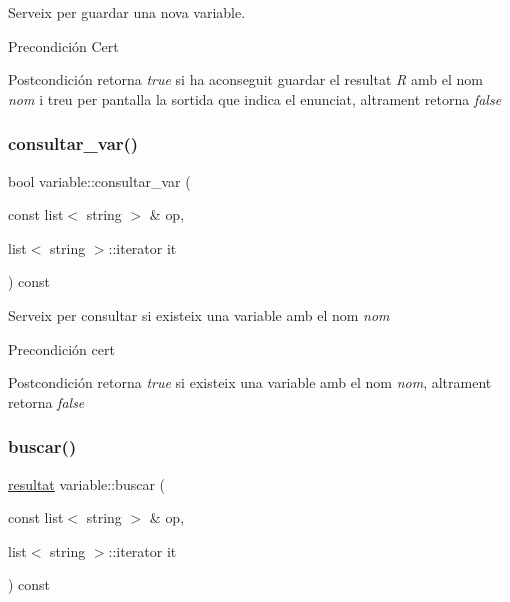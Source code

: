 Serveix per guardar una nova variable. 

\begin{DoxyPrecond}{Precondición}
Cert 
\end{DoxyPrecond}
\begin{DoxyPostcond}{Postcondición}
retorna {\itshape true} si ha aconseguit guardar el resultat {\itshape R} amb el nom {\itshape nom} i treu per pantalla la sortida que indica el enunciat, altrament retorna {\itshape false} 
\end{DoxyPostcond}
\hypertarget{classvariable_a0b8c6b4971c4f88aa6554e72a76b23fc}{}\label{classvariable_a0b8c6b4971c4f88aa6554e72a76b23fc} 
\subsubsection{\texorpdfstring{consultar\+\_\+var()}{consultar\_var()}}
{\footnotesize\ttfamily bool variable\+::consultar\+\_\+var (\begin{DoxyParamCaption}\item[{const list$<$ string $>$ \&}]{op,  }\item[{list$<$ string $>$\+::iterator}]{it }\end{DoxyParamCaption}) const}



Serveix per consultar si existeix una variable amb el nom {\itshape nom} 

\begin{DoxyPrecond}{Precondición}
cert 
\end{DoxyPrecond}
\begin{DoxyPostcond}{Postcondición}
retorna {\itshape true} si existeix una variable amb el nom {\itshape nom}, altrament retorna {\itshape false} 
\end{DoxyPostcond}
\hypertarget{classvariable_a1d4aa21d6874589f26ec2e7bf08d3e67}{}\label{classvariable_a1d4aa21d6874589f26ec2e7bf08d3e67} 
\subsubsection{\texorpdfstring{buscar()}{buscar()}}
{\footnotesize\ttfamily \hyperlink{classresultat}{resultat} variable\+::buscar (\begin{DoxyParamCaption}\item[{const list$<$ string $>$ \&}]{op,  }\item[{list$<$ string $>$\+::iterator}]{it }\end{DoxyParamCaption}) const}



